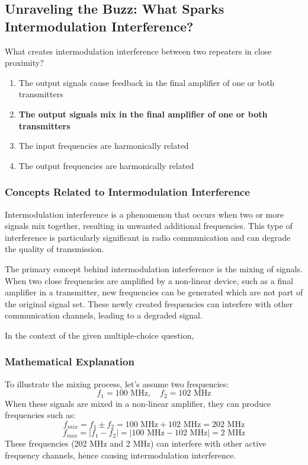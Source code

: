 \subsection{Unraveling the Buzz: What Sparks Intermodulation Interference?}

\begin{tcolorbox}[colback=gray!10, colframe=black, title=E4D03`]
What creates intermodulation interference between two repeaters in close proximity? 

\begin{enumerate}[label=\Alph*.]
    \item The output signals cause feedback in the final amplifier of one or both transmitters
    \item \textbf{The output signals mix in the final amplifier of one or both transmitters}
    \item The input frequencies are harmonically related
    \item The output frequencies are harmonically related
\end{enumerate} \end{tcolorbox}

\subsubsection{Concepts Related to Intermodulation Interference}

Intermodulation interference is a phenomenon that occurs when two or more signals mix together, resulting in unwanted additional frequencies. This type of interference is particularly significant in radio communication and can degrade the quality of transmission. 

The primary concept behind intermodulation interference is the mixing of signals. When two close frequencies are amplified by a non-linear device, such as a final amplifier in a transmitter, new frequencies can be generated which are not part of the original signal set. These newly created frequencies can interfere with other communication channels, leading to a degraded signal.

In the context of the given multiple-choice question, 

\subsubsection{Mathematical Explanation}

To illustrate the mixing process, let's assume two frequencies:
\[
f_1 = 100 \text{ MHz}, \quad f_2 = 102 \text{ MHz}
\]
When these signals are mixed in a non-linear amplifier, they can produce frequencies such as:
\[
f_{mix} = f_1 \pm f_2 = 100 \text{ MHz} + 102 \text{ MHz} = 202 \text{ MHz}
\]
\[
f_{mix} = |f_1 - f_2| = |100 \text{ MHz} - 102 \text{ MHz}| = 2 \text{ MHz}
\]
These frequencies (202 MHz and 2 MHz) can interfere with other active frequency channels, hence causing intermodulation interference.

